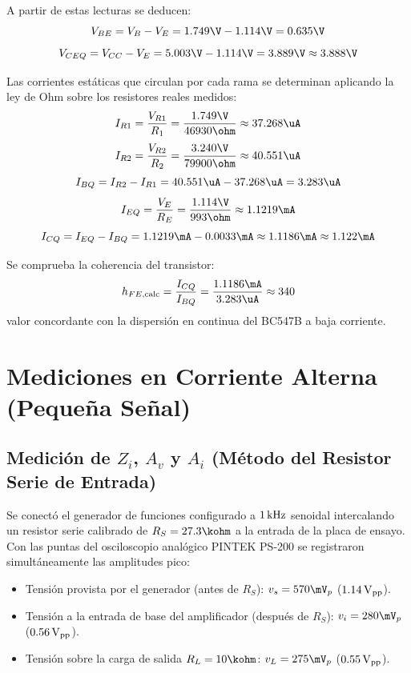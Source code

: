 A partir de estas lecturas se deducen:
\begin{equation}
  V_{BE} = V_B - V_E = 1.749\V - 1.114\V = 0.635\V
\end{equation}
\begin{equation}
  V_{CEQ} = V_{CC} - V_E = 5.003\V - 1.114\V = 3.889\V \approx 3.888\V
\end{equation}

Las corrientes estáticas que circulan por cada rama se determinan aplicando la ley de Ohm sobre los resistores reales medidos:
\begin{equation}
  I_{R1} = \frac{V_{R1}}{R_1} = \frac{1.749\V}{46930\ohm} \approx 37.268\uA
\end{equation}
\begin{equation}
  I_{R2} = \frac{V_{R2}}{R_2} = \frac{3.240\V}{79900\ohm} \approx 40.551\uA
\end{equation}
\begin{equation}
  I_{BQ} = I_{R2} - I_{R1} = 40.551\uA - 37.268\uA = 3.283\uA
\end{equation}
\begin{equation}
  I_{EQ} = \frac{V_E}{R_E} = \frac{1.114\V}{993\ohm} \approx 1.1219\mA
\end{equation}
\begin{equation}
  I_{CQ} = I_{EQ} - I_{BQ} = 1.1219\mA - 0.0033\mA \approx 1.1186\mA \approx 1.122\mA
\end{equation}

Se comprueba la coherencia del transistor:
\begin{equation}
  h_{FE,\mathrm{calc}} = \frac{I_{CQ}}{I_{BQ}} = \frac{1.1186\mA}{3.283\uA} \approx 340
\end{equation}
valor concordante con la dispersión en continua del BC547B a baja corriente.

\section{Mediciones en Corriente Alterna (Pequeña Señal)}

\subsection{Medición de \texorpdfstring{$Z_i$, $A_v$ y $A_i$}{Zi, Av y Ai} (Método del Resistor Serie de Entrada)}
Se conectó el generador de funciones configurado a $1\,\mathrm{kHz}$ senoidal intercalando un resistor serie calibrado de
$R_S = 27.3\kohm$ a la entrada de la placa de ensayo. Con las puntas del osciloscopio analógico PINTEK PS-200 se
registraron simultáneamente las amplitudes pico:
\begin{itemize}
  \item Tensión provista por el generador (antes de $R_S$): $v_s = 570\mV_p$ ($1.14\,\mathrm{V}_{\mathrm{pp}}$).
  \item Tensión a la entrada de base del amplificador (después de $R_S$): $v_i = 280\mV_p$ ($0.56\,\mathrm{V}_{\mathrm{pp}}$).
  \item Tensión sobre la carga de salida $R_L = 10\kohm$: $v_L = 275\mV_p$ ($0.55\,\mathrm{V}_{\mathrm{pp}}$).
\end{itemize}

